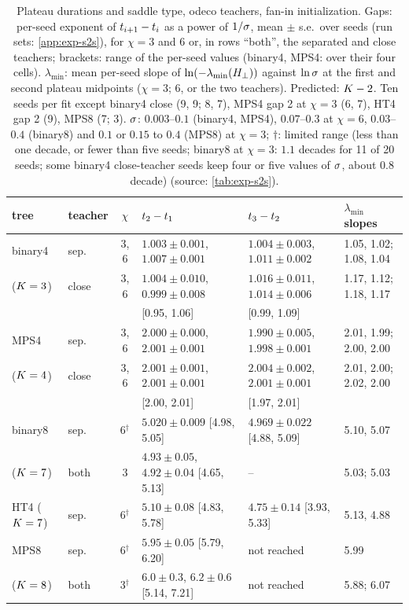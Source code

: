 \begin{table}[tbp]
  \centering
  \caption{Plateau durations and saddle type, odeco teachers, fan-in initialization. Gaps: per-seed exponent
    of $t_{i+1}-t_{i}$ as a power of $1/\sigma$, mean $\pm$ s.e.\ over seeds (run sets: \cref{app:exp-s2s}),
    for $\chi=3$ and $6$ or, in rows ``both'', the separated and close teachers; brackets: range of the
    per-seed values (binary4, MPS4: over their four cells). $\lambda_{\min}$: mean per-seed slope of
    $\ln(-\lambda_{\min}(H_{\perp}))$ against $\ln\sigma$ at the first and second plateau midpoints ($\chi=3$; $6$, or
    the two teachers). Predicted: $K-2$. Ten seeds per fit except binary4 close (9, 9; 8, 7), MPS4 gap 2 at
    $\chi=3$ (6, 7), HT4 gap 2 (9), MPS8 (7; 3). $\sigma$: $0.003$--$0.1$ (binary4, MPS4), $0.07$--$0.3$ at
    $\chi=6$, $0.03$--$0.4$ (binary8) and $0.1$ or $0.15$ to $0.4$ (MPS8) at $\chi=3$; $\dagger$: limited range
    (less than one decade, or fewer than five seeds; binary8 at $\chi=3$: $1.1$ decades for 11 of 20 seeds; some
    binary4 close-teacher seeds keep four or five values of $\sigma$, about $0.8$ decade) (source: \cref{tab:exp-s2s}).}
  \label{tab:s2s-gaps}
  \footnotesize
  \setlength{\tabcolsep}{3pt}
  \begin{tabular}{@{}llc lll@{}}
    \toprule
    tree & teacher & $\chi$ & $t_{2}-t_{1}$ & $t_{3}-t_{2}$ & $\lambda_{\min}$ slopes \\
    \midrule
    binary4 & sep. & 3, 6 & $1.003\pm0.001$, $1.007\pm0.001$ & $1.004\pm0.003$, $1.011\pm0.002$ & 1.05, 1.02; 1.08, 1.04 \\
    ($K=3$) & close & 3, 6 & $1.004\pm0.010$, $0.999\pm0.008$ & $1.016\pm0.011$, $1.014\pm0.006$ & 1.17, 1.12; 1.18, 1.17 \\
            & & & [0.95, 1.06] & [0.99, 1.09] & \\
    MPS4    & sep. & 3, 6 & $2.000\pm0.000$, $2.001\pm0.001$ & $1.990\pm0.005$, $1.998\pm0.001$ & 2.01, 1.99; 2.00, 2.00 \\
    ($K=4$) & close & 3, 6 & $2.001\pm0.001$, $2.001\pm0.001$ & $2.004\pm0.002$, $2.001\pm0.001$ & 2.01, 2.00; 2.02, 2.00 \\
            & & & [2.00, 2.01] & [1.97, 2.01] & \\
    binary8 & sep. & 6$^\dagger$ & $5.020\pm0.009$ [4.98, 5.05] & $4.969\pm0.022$ [4.88, 5.09] & 5.10, 5.07 \\
    ($K=7$) & both & 3 & $4.93\pm0.05$, $4.92\pm0.04$ [4.65, 5.13] & -- & 5.03; 5.03 \\
    HT4 ($K=7$) & sep. & 6$^\dagger$ & $5.10\pm0.08$ [4.83, 5.78] & $4.75\pm0.14$ [3.93, 5.33] & 5.13, 4.88 \\
    MPS8    & sep. & 6$^\dagger$ & $5.95\pm0.05$ [5.79, 6.20] & not reached & 5.99 \\
    ($K=8$) & both & 3$^\dagger$ & $6.0\pm0.3$, $6.2\pm0.6$ [5.14, 7.21] & not reached & 5.88; 6.07 \\
    \bottomrule
  \end{tabular}
\end{table}

